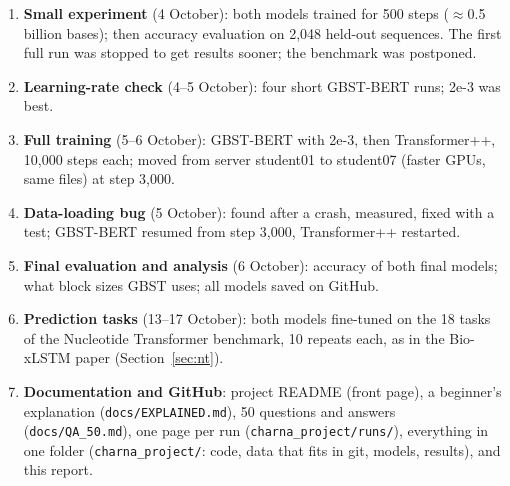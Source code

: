\documentclass[11pt,a4paper]{article}
\newcommand{\code}[1]{\texttt{\small #1}}
\begin{document}
\begin{enumerate}[leftmargin=*]
  only 1/8 of each region; (e) smaller script issues (wrong exit status in a log, a path error).
\item \textbf{Small experiment} (4 October): both models trained for 500 steps
  ($\approx$0.5 billion bases); then accuracy evaluation on 2,048 held-out sequences. The
  first full run was stopped to get results sooner; the benchmark was postponed.
\item \textbf{Learning-rate check} (4--5 October): four short GBST-BERT runs; 2e-3 was best.
\item \textbf{Full training} (5--6 October): GBST-BERT with 2e-3, then Transformer++, 10,000 steps
  each; moved from server student01 to student07 (faster GPUs, same files) at step 3,000.
\item \textbf{Data-loading bug} (5 October): found after a crash, measured, fixed with a test;
  GBST-BERT resumed from step 3,000, Transformer++ restarted.
\item \textbf{Final evaluation and analysis} (6 October): accuracy of both final models; what
  block sizes GBST uses; all models saved on GitHub.
\item \textbf{Prediction tasks} (13--17 October): both models fine-tuned on the 18 tasks of the
  Nucleotide Transformer benchmark, 10 repeats each, as in the Bio-xLSTM paper (Section~\ref{sec:nt}).
\item \textbf{Documentation and GitHub}: project README (front page), a beginner's explanation
  (\code{docs/EXPLAINED.md}), 50 questions and answers (\code{docs/QA\_50.md}), one page per run
  (\code{charna\_project/runs/}), everything in one folder (\code{charna\_project/}: code, data
  that fits in git, models, results), and this report.
\end{enumerate}
\end{document}
